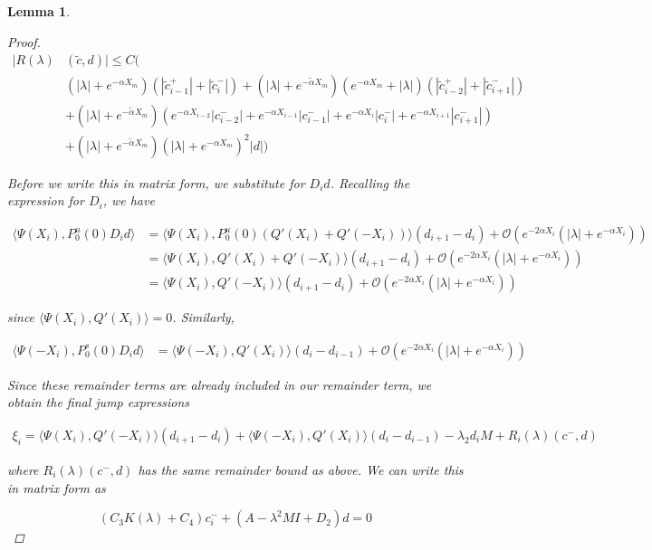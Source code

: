 \documentclass[12pt]{article}
\newtheorem{lemma}{Lemma}
\begin{document}
\begin{lemma}
\begin{proof}
\begin{align*}
|R(\lambda)&(\tilde{c}, d)| \leq C \Big( \\
&(|\lambda| + e^{-\alpha X_m})(|\tilde{c}_{i-1}^+| + |\tilde{c}_{i}^-|) + (|\lambda| + e^{-\tilde{\alpha} X_m})(e^{-\alpha X_m} + |\lambda|) ( |\tilde{c}_{i-2}^+| + |\tilde{c}_{i+1}^-|)  \\
&+ (|\lambda| + e^{-\tilde{\alpha} X_m})( e^{-\alpha X_{i-2}} |c_{i-2}^-| + e^{-\alpha X_{i-1}} |c_{i-1}^-| + e^{-\alpha X_i} |c_i^-| + e^{-\alpha X_{i+1}} |c_{i+1}^-|) \\
&+ (|\lambda| + e^{-\tilde{\alpha} X_m})(|\lambda| + e^{-\alpha X_m})^2 |d| \Big)
\end{align*}

Before we write this in matrix form, we substitute for $D_i d$. Recalling the expression for $D_i$, we have

\begin{align*}
\langle \Psi(X_i), P_0^u(0) D_i d \rangle
&= \langle \Psi(X_i), P_0^u(0) (Q'(X_i) + Q'(-X_i)) \rangle (d_{i+1} - d_i)
+\mathcal{O}(e^{-2 \alpha X_i}(|\lambda| + e^{-\alpha X_i})) \\
&= \langle \Psi(X_i), Q'(X_i) + Q'(-X_i) \rangle (d_{i+1} - d_i)
+\mathcal{O}(e^{-2 \alpha X_i}(|\lambda| + e^{-\alpha X_i})) \\
&= \langle \Psi(X_i), Q'(-X_i) \rangle (d_{i+1} - d_i)
+\mathcal{O}(e^{-2 \alpha X_i}(|\lambda| + e^{-\alpha X_i})) 
\end{align*}

since $\langle \Psi(X_i), Q'(X_i) \rangle = 0$. Similarly, 

\begin{align*}
\langle \Psi(-X_i), P_0^s(0) D_i d \rangle
&= \langle \Psi(-X_i), Q'(X_i) \rangle (d_i - d_{i-1})
+\mathcal{O}(e^{-2 \alpha X_i}(|\lambda| + e^{-\alpha X_i})) 
\end{align*}

Since these remainder terms are already included in our remainder term, we obtain the final jump expressions

\begin{align*}
\xi_i = \langle \Psi(X_i), Q'(-X_i) \rangle (d_{i+1} - d_i)
+ \langle \Psi(-X_i), Q'(X_i) \rangle (d_i - d_{i-1})
- \lambda_2 d_i M + R_i(\lambda)(c^-, d)
\end{align*}

where $R_i(\lambda)(c^-, d)$ has the same remainder bound as above. We can write this in matrix form as

\[
(C_3 K(\lambda) + C_4) c_i^- + (A -\lambda^2 M I + D_2)d = 0
\]


\end{proof}
\end{lemma}
\end{document}
